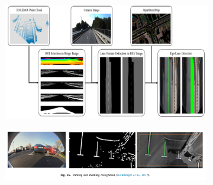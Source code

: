 \begin{figure}[!ht]
\begin{subfigure}{0.4\textwidth}
    \end{subfigure}
    \begin{subfigure}{0.5\textwidth}
        \includegraphics[width=\textwidth]{img/14 Screenshot_20231106_143419}\label{fig:14}
    \end{subfigure}
    \begin{subfigure}{\textwidth}
        \includegraphics[width=0.99\textwidth]{img/16Screenshot_20231106_143701}\label{fig:16}
    \end{subfigure}
\end{figure}
\clearpage

